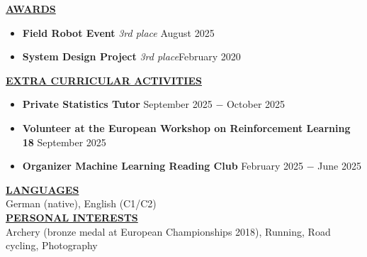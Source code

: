 \documentclass{article}
\begin{document}

\noindent \textbf{\underline{AWARDS}}

\begin{itemize}[noitemsep,nolistsep,leftmargin=*]
\item \textbf{Field Robot Event} \textit{3rd place} \hfill August 2025
\item \textbf{System Design Project} \textit{3rd place}\hfill February 2020\\
\end{itemize}

\noindent \textbf{\underline{EXTRA CURRICULAR ACTIVITIES}}

\begin{itemize}[noitemsep,nolistsep,leftmargin=*]
\item \textbf{Private Statistics Tutor} \hfill September 2025 $-$ October 2025
\item \textbf{Volunteer at the European Workshop on Reinforcement Learning 18} \hfill September 2025
\item \textbf{Organizer Machine Learning Reading Club} \hfill February 2025 $-$ June 2025 \\
\end{itemize}




\noindent \textbf{\underline{LANGUAGES}} \\ 

German (native), English (C1/C2)
\vspace{0.25cm} \\

\noindent \textbf{\underline{PERSONAL INTERESTS}} \\

Archery (bronze medal at European Championships 2018), Running, Road cycling, Photography
\end{document}
